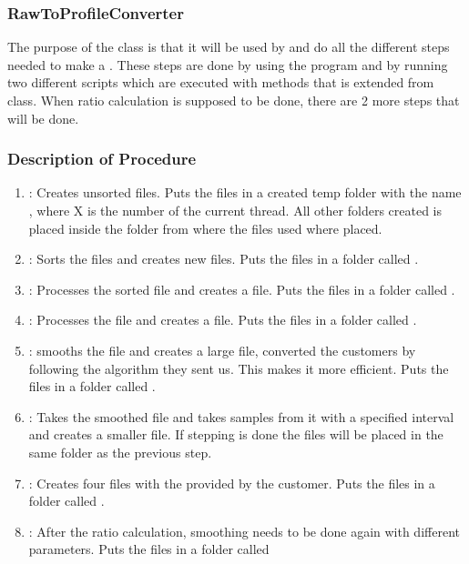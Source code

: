 \subsubsection{RawToProfileConverter}
The purpose of the  class is that it will be used by
 and do all the different steps needed to make a . These steps are done by using the program  and by running
two different scripts which are executed with methods that is extended from
 class. When ratio calculation is supposed to be done, there are 2 more steps that will be done.

\subsubsection{Description of Procedure}

\begin{enumerate}
\item {}: Creates unsorted  files. Puts the files in a
created temp folder with the name , where X is the number of the current thread. All other folders created is placed inside the folder from where the files used where placed.

\item {}: Sorts the  files and creates new 
files. Puts the files in a folder called .

\item {}: Processes the sorted  file and creates a
 file. Puts the files in a folder called .

\item {}: Processes the  file and creates a 
file. Puts the files in a folder called .

\item {}: smooths the file and creates a large  file,
converted the customers  by following the algorithm they  sent
us. This makes it more efficient. Puts the files in a folder called
.

\item {}: Takes the smoothed  file and takes samples from it
with a specified interval and creates a smaller  file. If stepping is done the files will be placed in the same folder as the previous step.

\item {}: Creates four  files with the
provided by the customer. Puts the files in a folder called .

\item {}: After the ratio calculation, smoothing needs to be done
again with different parameters. Puts the files in a folder called
\end{enumerate}


